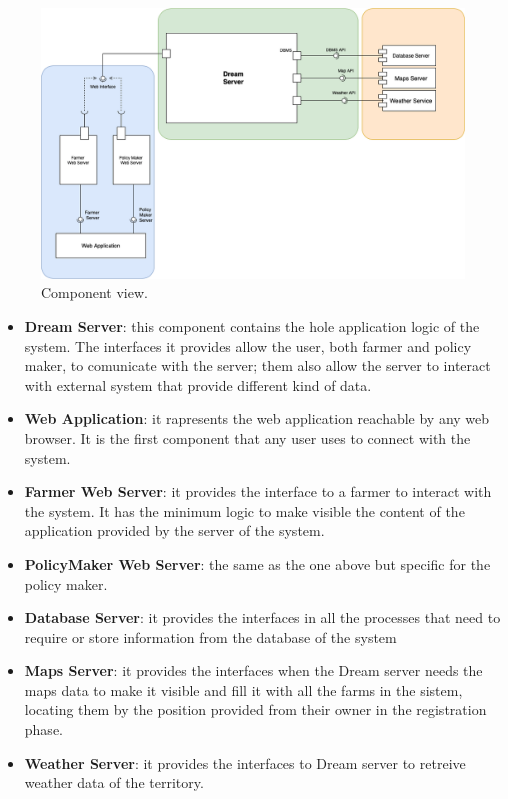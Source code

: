 \begin{figure}[H]
    \begin{center}
    \includegraphics[width=1\textwidth]{images/Component3.png}
    \caption{Component view.}
    \label{fig:component view2}
    \end{center}
\end{figure}

\begin{itemize}
    \item \textbf{Dream Server}: this component contains the hole application logic of the system. The interfaces it provides allow the user, both farmer and policy maker, to comunicate with the server; them also allow the server to interact with external system that provide different kind of data.
    \item \textbf{Web Application}: it rapresents the web application reachable by any web browser. It is the first component that any user uses to connect with the system.
    \item \textbf{Farmer Web Server}: it provides the interface to a farmer to interact with the system. It has the minimum logic to make visible the content of the application provided by the server of the system. 
    \item \textbf{PolicyMaker Web Server}: the same as the one above but specific for the policy maker.
    \item \textbf{Database Server}: it provides the interfaces in all the processes that need to require or store information from the database of the system
    \item \textbf{Maps Server}: it provides the interfaces when the Dream server needs the maps data to make it visible and fill it with all the farms in the sistem, locating them by the position provided from their owner in the registration phase.
    \item \textbf{Weather Server}: it provides the interfaces to Dream server to retreive weather data of the territory.
\end{itemize}

